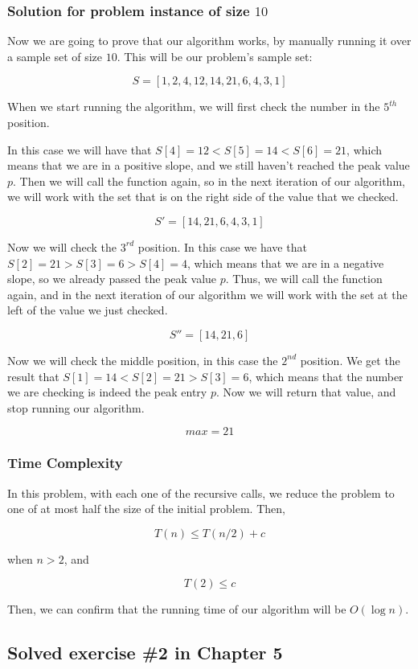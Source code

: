 \documentclass{article}
\begin{document}
\subsubsection*{Solution for problem instance of size $10$}

Now we are going to prove that our algorithm works, by manually running it over a sample set of size $10$. This will be our problem's sample set:

$$S = [1,2,4,12,14,21,6,4,3,1]$$

When we start running the algorithm, we will first check the number in the $5^{th}$ position.

In this case we will have that $S[4] = 12<S[5] = 14<S[6] = 21$, which means that we are in a positive slope, and we still haven't reached the peak value $p$. Then we will call the function again, so in the next iteration of our algorithm, we will work with the set that is on the right side of the value that we checked.

$$S' = [14,21,6,4,3,1]$$

Now we will check the $3^{rd}$ position. In this case we have that $S[2] = 21>S[3] = 6>S[4] = 4$, which means that we are in a negative slope, so we already passed the peak value $p$. Thus, we will call the function again, and in the next iteration of our algorithm we will work with the set at the left of the value we just checked.

$$S'' = [14,21,6]$$

Now we will check the middle position, in this case the $2^{nd}$ position. We get the result that $S[1] = 14<S[2] = 21>S[3] = 6$, which means that the number we are checking is indeed the peak entry $p$. Now we will return that value, and stop running our algorithm.

$$max = 21$$

\subsubsection*{Time Complexity}

In this problem, with each one of the recursive calls, we reduce the problem to one of at most half the size of the initial problem. Then,

$$T(n)\leq T(n/2) + c$$

when $n>2$, and

$$T(2)\leq c$$

Then, we can confirm that the running time of our algorithm will be $O(\log n)$.

\subsection*{Solved exercise \#2 in Chapter 5}
\end{document}
